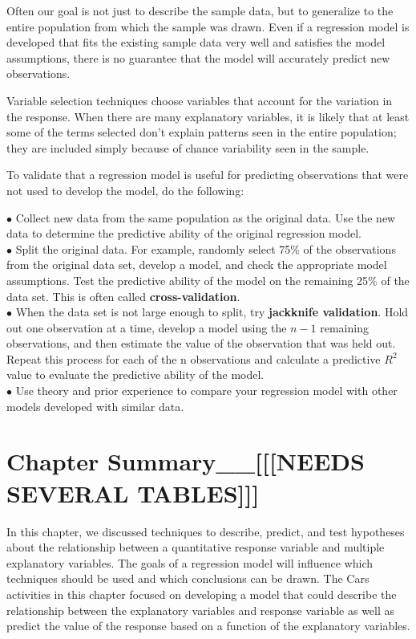\documentclass[
]{report}
\begin{document}
Often our goal is not just to describe the sample data, but to generalize to the entire population from which the sample was drawn. Even if a regression model is developed that fits the existing sample data very well and satisfies the model assumptions, there is no guarantee that the model will accurately predict new observations.

Variable selection techniques choose variables that account for the variation in the response. When there are many explanatory variables, it is likely that at least some of the terms selected don't explain patterns seen in the entire population; they are included simply because of chance variability seen in the sample.

To validate that a regression model is useful for predicting observations that were not used to develop
the model, do the following:

\(\bullet\) Collect new data from the same population as the original data. Use the new data to determine the
predictive ability of the original regression model.\\
\(\bullet\) Split the original data. For example, randomly select 75\% of the observations from the original data
set, develop a model, and check the appropriate model assumptions. Test the predictive ability of the
model on the remaining 25\% of the data set. This is often called \textbf{cross-validation}.\\
\(\bullet\) When the data set is not large enough to split, try \textbf{jackknife validation}. Hold out one observation at
a time, develop a model using the \(n-1\) remaining observations, and then estimate the value of the observation that was held out. Repeat this process for each of the n observations and calculate a predictive \(R^2\) value to evaluate the predictive ability of the model.\\
\(\bullet\) Use theory and prior experience to compare your regression model with other models developed with
similar data.

\section{Chapter Summary\_\_{[}{[}{[}NEEDS SEVERAL TABLES{]}{]}{]}}\label{chapter-summary__needs-several-tables}

In this chapter, we discussed techniques to describe, predict, and test hypotheses about the relationship
between a quantitative response variable and multiple explanatory variables. The goals of a regression model
will influence which techniques should be used and which conclusions can be drawn. The Cars activities
in this chapter focused on developing a model that could describe the relationship between the explanatory
variables and response variable as well as predict the value of the response based on a function of the explanatory variables.
\end{document}
